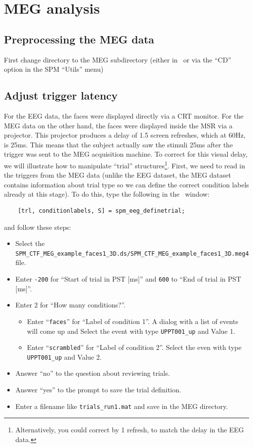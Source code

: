 \section{MEG analysis \label{multimodal:data:meg}}

\subsection{Preprocessing the MEG data\label{multimodal:data:meg:preproc}}

First change directory to the MEG subdirectory (either in \matlab\, or via the ``CD'' option in the SPM ``Utils'' menu)

\subsection{Adjust trigger latency}

For the EEG data, the faces were displayed directly via a CRT monitor. For the MEG data on the other hand, the faces were displayed inside the MSR via a projector. This projector produces a delay of 1.5 screen refreshes, which at 60Hz, is 25ms. This means that the subject actually saw the stimuli 25ms after the trigger was sent to the MEG acquisition machine. To correct for this visual delay, we will illustrate how to manipulate ``trial'' structures\footnote{Alternatively, you could correct by 1 refresh, to match the delay in the EEG data.}. First, we need to read in the triggers from the MEG data (unlike the EEG dataset, the MEG dataset contains information about trial type so we can define the correct condition labels already at this stage). To do this, type the following in the \matlab\ window:

\begin{verbatim}
    [trl, conditionlabels, S] = spm_eeg_definetrial;
\end{verbatim}

and follow these steps:
\begin{itemize}
 \item Select the \texttt{SPM\_CTF\_MEG\_example\_faces1\_3D.ds/SPM\_CTF\_MEG\_example\_faces1\_3D.meg4} file.
 \item Enter \texttt{-200} for ``Start of trial in PST [ms]'' and \texttt{600} to ``End of trial in PST [ms]''.
 \item Enter 2 for ``How many conditions?''.
 \begin{itemize}
  \item Enter ``\texttt{faces}'' for ``Label of condition 1''. A dialog with a list of events will come up and Select the event with type \texttt{UPPT001\_up} and Value 1.
  \item Enter ``\texttt{scrambled}'' for ``Label of condition 2''. Select the even with type \texttt{UPPT001\_up} and Value 2.
 \end{itemize}
 \item Answer ``no'' to the question about reviewing trials.
 \item Answer ``yes'' to the prompt to save the trial definition.
 \item Enter a filename like \texttt{trials\_run1.mat} and save in the MEG directory.
\end{itemize}

